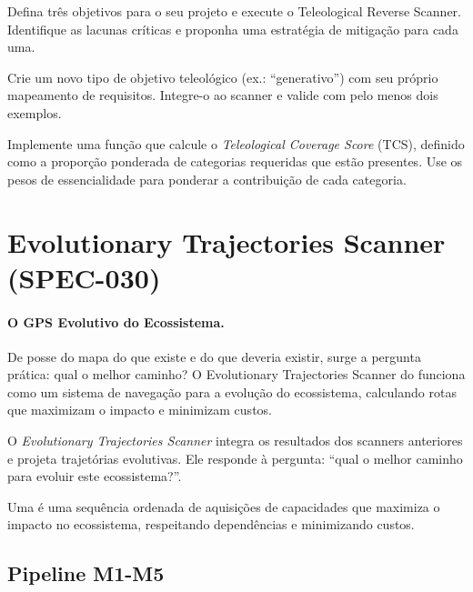 \begin{exercicio}
Defina três objetivos para o seu projeto e execute o Teleological Reverse
Scanner. Identifique as lacunas críticas e proponha uma estratégia de
mitigação para cada uma.
\end{exercicio}

\begin{exercicio}
Crie um novo tipo de objetivo teleológico (ex.: ``generativo'') com seu
próprio mapeamento de requisitos. Integre-o ao scanner e valide com pelo
menos dois exemplos.
\end{exercicio}

\begin{exercicio}
Implemente uma função que calcule o \emph{Teleological Coverage Score} (TCS),
definido como a proporção ponderada de categorias requeridas que estão
presentes. Use os pesos de essencialidade para ponderar a contribuição
de cada categoria.
\end{exercicio}

\section{Evolutionary Trajectories Scanner (SPEC-030)}
\label{sec:evolutionary-scanner}
\nivelphd

\paragraph{O GPS Evolutivo do Ecossistema.} De posse do mapa do que existe e do que deveria existir, surge a pergunta prática: qual o melhor caminho? O Evolutionary Trajectories Scanner do \opencodeeco{} funciona como um sistema de navegação para a evolução do ecossistema, calculando rotas que maximizam o impacto e minimizam custos.

O \emph{Evolutionary Trajectories Scanner} integra os resultados dos
scanners anteriores e projeta trajetórias evolutivas. Ele responde à
pergunta: ``qual o melhor caminho para evoluir este ecossistema?''.

\begin{definicao}
Uma  é uma sequência ordenada de aquisições
de capacidades que maximiza o impacto no ecossistema, respeitando
dependências e minimizando custos.
\end{definicao}

\subsection{Pipeline M1-M5}

